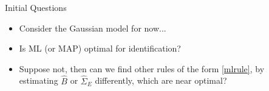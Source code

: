 \documentclass[final]{beamer}
\newlength{\sepwid}
\newlength{\onecolwid}
\begin{document}
\begin{frame}[t]
\begin{columns}[t]
\begin{column}{\onecolwid}
\begin{block}{Initial Questions}
\begin{itemize}
\item Consider the Gaussian model for now...
\item Is ML (or MAP) optimal for identification?
\item Suppose not, then can we find other rules of the form \eqref{mlrule}, by estimating $\hat{B}$ or $\hat{\Sigma}_E$ differently, which are near optimal?
\end{itemize}
\end{block}







\end{column} %

\begin{column}{\sepwid}\end{column} %


\begin{column}{\onecolwid}


\end{column}
\end{columns}
\end{frame}
\end{document}
